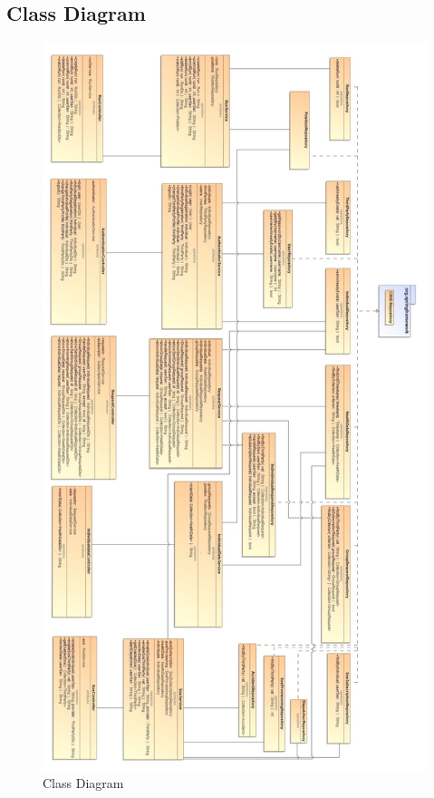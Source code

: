 \documentclass[a4paper]{article}
\begin{document}
\subsection{Class Diagram}
\begin{figure}[!htpb]
    \centering
    \includegraphics[width=180mm,keepaspectratio,angle=90]{DD/images/UML/ClassDiagram.jpg}
    \caption{Class Diagram}
    \label{fig:CD_trackme}
\end{figure}
\end{document}
